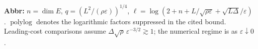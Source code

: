 \begin{table}[tp]
\begin{threeparttable}
\begin{tabularx}{\linewidth}{@{}>{\raggedright\arraybackslash}p{0.20\linewidth}>{\raggedright\arraybackslash}p{0.32\linewidth}>{\raggedright\arraybackslash}p{0.25\linewidth}>{\raggedright\arraybackslash}X@{}}
\bottomrule
\end{tabularx}
\begin{tablenotes}[flushleft]\footnotesize
\item[] \textbf{Abbr:} $n=\dim E$, $q=(L^2/(\rho\varepsilon))^{1/4}$, $\ell=\log(2+n+L/\sqrt{\rho\varepsilon}+\sqrt{L\Delta}/\varepsilon)$. $\operatorname{polylog}$ denotes the logarithmic factors suppressed in the cited bound. Leading-cost comparisons assume $\Delta\sqrt\rho\,\varepsilon^{-3/2}\gtrsim1$; the numerical regime is as $\varepsilon\downarrow0$.
\end{tablenotes}
\end{threeparttable}
\end{table}
\clearpage
